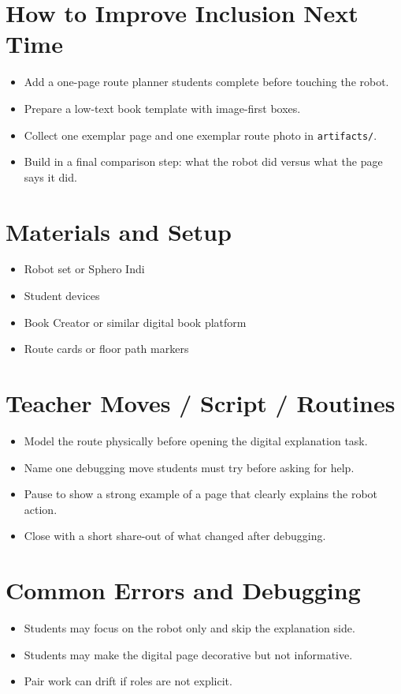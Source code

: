 \documentclass[11pt]{article}
\begin{document}
\section*{How to Improve Inclusion Next Time}
\begin{itemize}[leftmargin=*]
\item Add a one-page route planner students complete before touching the robot.
\item Prepare a low-text book template with image-first boxes.
\item Collect one exemplar page and one exemplar route photo in \texttt{artifacts/}.
\item Build in a final comparison step: what the robot did versus what the page says it did.
\end{itemize}

\section*{Materials and Setup}
\begin{itemize}[leftmargin=*]
\item Robot set or Sphero Indi
\item Student devices
\item Book Creator or similar digital book platform
\item Route cards or floor path markers
\end{itemize}

\section*{Teacher Moves / Script / Routines}
\begin{itemize}[leftmargin=*]
\item Model the route physically before opening the digital explanation task.
\item Name one debugging move students must try before asking for help.
\item Pause to show a strong example of a page that clearly explains the robot action.
\item Close with a short share-out of what changed after debugging.
\end{itemize}

\section*{Common Errors and Debugging}
\begin{itemize}[leftmargin=*]
\item Students may focus on the robot only and skip the explanation side.
\item Students may make the digital page decorative but not informative.
\item Pair work can drift if roles are not explicit.
\end{itemize}
\end{document}
